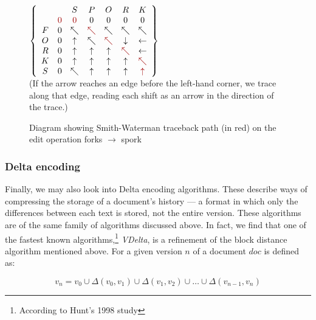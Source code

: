 \documentclass[a4paper,11pt,twoside,notitlepage]{article}
\begin{document}
        \begin{figure}[h]
          \centering
          $\left\{
                \begin{array}{ccccccc}
                    &   & S & P & O & R & K \\
                    & \color{red}{0} & \color{red}{0} & 0 & 0 & 0 & 0 \\
                  F & 0 & \nwarrow & \color{red}{\nwarrow} & \nwarrow & \nwarrow & \nwarrow \\
                  O & 0 & \uparrow & \nwarrow & \color{red}{\nwarrow} & \downarrow & \leftarrow \\
                  R & 0 & \uparrow & \uparrow & \uparrow & \color{red}{\nwarrow} & \leftarrow \\
                  K & 0 & \uparrow & \uparrow & \uparrow & \uparrow & \color{red}{\nwarrow} \\
                  S & 0 & \nwarrow & \uparrow & \uparrow & \uparrow & \color{red}{\uparrow} \\
                \end{array}\right\} $\\
                (If the arrow reaches an edge before the left-hand
                corner, we trace along that edge, reading each shift
                as an arrow in the direction of the trace.)
                \caption{Diagram showing Smith-Waterman traceback path
                  (in red) on the edit operation forks $\rightarrow$
                  spork}
          \label{fig:smith-waterman-traceback}
        \end{figure}

        \subsubsection*{Delta encoding}
        Finally, we may also look into Delta encoding
        algorithms. These describe ways of compressing the storage of
        a document's history --- a format in which only the
        differences between each text is stored, not the entire
        version. These algorithms are of the same family of algorithms
        discussed above. In fact, we find that one of the fastest
        known algorithms,\footnote{According to Hunt's 1998
          study\cite{Hunt1998}} \textit{VDelta}, is a refinement of
        the block distance algorithm mentioned above. For a given
        version $n$ of a document $doc$ is defined as:
        
        $$v_n = v_0 \cup {\Delta}(v_0,v_1) \cup {\Delta}(v_1,v_2)
        \cup \dots \cup {\Delta}(v_{n-1},v_n) $$
\end{document}
